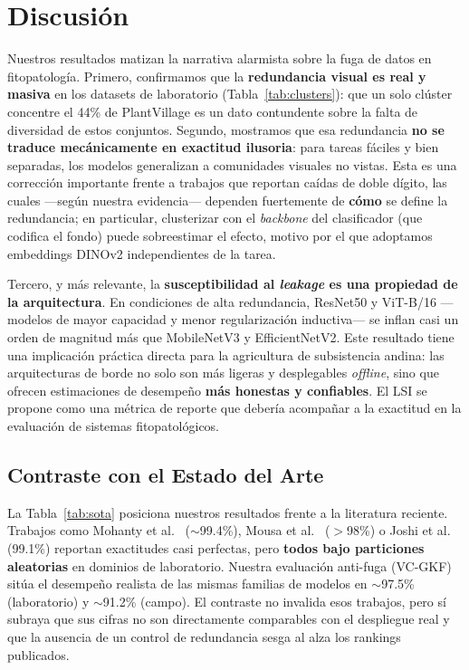 \documentclass[journal,compsoc]{IEEEtran}
\begin{document}
\section{Discusión}
Nuestros resultados matizan la narrativa alarmista sobre la fuga de datos en fitopatología. Primero, confirmamos que la \textbf{redundancia visual es real y masiva} en los datasets de laboratorio (Tabla~\ref{tab:clusters}): que un solo clúster concentre el 44\% de PlantVillage es un dato contundente sobre la falta de diversidad de estos conjuntos. Segundo, mostramos que esa redundancia \textbf{no se traduce mecánicamente en exactitud ilusoria}: para tareas fáciles y bien separadas, los modelos generalizan a comunidades visuales no vistas. Esta es una corrección importante frente a trabajos que reportan caídas de doble dígito, las cuales ---según nuestra evidencia--- dependen fuertemente de \textbf{cómo} se define la redundancia; en particular, clusterizar con el \textit{backbone} del clasificador (que codifica el fondo) puede sobreestimar el efecto, motivo por el que adoptamos embeddings DINOv2 independientes de la tarea.

Tercero, y más relevante, la \textbf{susceptibilidad al \textit{leakage} es una propiedad de la arquitectura}. En condiciones de alta redundancia, ResNet50 y ViT-B/16 ---modelos de mayor capacidad y menor regularización inductiva--- se inflan casi un orden de magnitud más que MobileNetV3 y EfficientNetV2. Este resultado tiene una implicación práctica directa para la agricultura de subsistencia andina: las arquitecturas de borde no solo son más ligeras y desplegables \textit{offline}, sino que ofrecen estimaciones de desempeño \textbf{más honestas y confiables}. El LSI se propone como una métrica de reporte que debería acompañar a la exactitud en la evaluación de sistemas fitopatológicos.

\subsection{Contraste con el Estado del Arte}
La Tabla~\ref{tab:sota} posiciona nuestros resultados frente a la literatura reciente. Trabajos como Mohanty et al.\ \cite{mohanty2016using} ($\sim$99.4\%), Mousa et al.\ \cite{mousa2025potato} ($>$98\%) o Joshi et al.\ \cite{joshi2025transfer} (99.1\%) reportan exactitudes casi perfectas, pero \textbf{todos bajo particiones aleatorias} en dominios de laboratorio. Nuestra evaluación anti-fuga (VC-GKF) sitúa el desempeño realista de las mismas familias de modelos en $\sim$97.5\% (laboratorio) y $\sim$91.2\% (campo). El contraste no invalida esos trabajos, pero sí subraya que sus cifras no son directamente comparables con el despliegue real y que la ausencia de un control de redundancia sesga al alza los rankings publicados.
\end{document}
